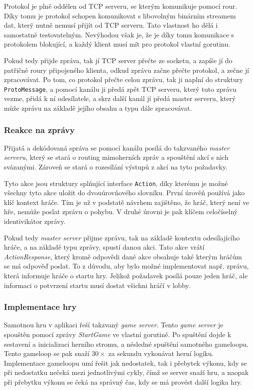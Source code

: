 \documentclass[12pt, a4paper]{article}
\begin{document}
    Protokol je plně oddělen od TCP serveru, se kterým komunikuje pomocí rour.
    Díky tomu je protokol schopen komunikovat s libovolným binárním streamem dat, který nutně nemusí přijít od TCP serveru.
    Tato vlastnost ho dělá i samostatně testovatelným.
    Nevýhodou však je, že je díky tomu komunikace s protokolem blokující, a každý klient musí mít pro protokol vlastní gorutinu.

    Pokud tedy přijde zpráva, tak jí TCP server přečte ze socketu, a zapíše jí do patřičné roury připojeného klienta, odkud zprávu začne přečte protokol, a zečne jí zpracovávat.
    Po tom, co protokol přečte celou zprávu, tak ji naplní do struktury \texttt{ProtoMessage}, a pomocí kanálu ji předá zpět TCP serveru, který tuto zprávu vezme, přidá k ní odesílatele, a skrz další kanál jí předá master serveru, který může zprávu na základě jejího obsahu a typu dále zpracovávat.

    \subsubsection{Reakce na zprávy}
    Přijatá a dekódovaná správa se pomocí kanálu posílá do takzvaného \textit{master serveru}, který se stará o routing mimoherních zpráv a spouštění akcí s nich svázanými.
    Zároveň se stará o rozesílání výstupů z akcí na tyto požadavky.

    Tyto akce jsou struktury splňující interface \texttt{Action}, díky kterému je možné všechny tyto akce uložit do dvouúrovňového slovníku.
    První úrověň používá jako klíč kontext hráče.
    Tím je už v podstatě návrhem zajištěno, že hráč, který není ve hře, nemůže poslat zprávu o pohybu.
    V druhé úrovni je pak klíčem celočíselný identivikátor zprávy.

    Pokud tedy \textit{master server} přijme zprávu, tak na základě kontextu odesílajícího hráče, a na základě typu zprávy, spustí danou akci.
    Tato akce vrátí \textit{ActionResponse}, který kromě odpovědi dané akce obsahuje také kterým hráčům se má odpověď poslat.
    To z důvodu, aby bylo možné implementovat např. zprávu, která informuje hráče o startu hry.
    Jelikož požadavek posílá pouze jeden hráč, ale informaci o potvrzení startu musí dostat všichni hráčí v lobby.

    \subsubsection{Implementace hry}
    Samotnou hru v aplikaci řeší takzvaný \textit{game server}.
    Tento \textit{game server} je spouštěn pomocí zprávy \textit{StartGame} ve vlastní gorutině.
    Po spuštění dojde k sestavení a inicializaci herního stromu, a nésledné spuštění samotného gameloopu.
    Tento gameloop se pak snaží $30\times$ za sekundu vykonávat herní logiku.
    Implementace gameloopu umí řešit jak nedostatek, tak i přebytek výkonu, kdy se při nedostatku nečeká mezi jednotlivými cykly, čímž se server snaží  hru, a naopak při přebytku výkonu se čeká na správný čas, kdy se má provést další logika hry.
\end{document}
